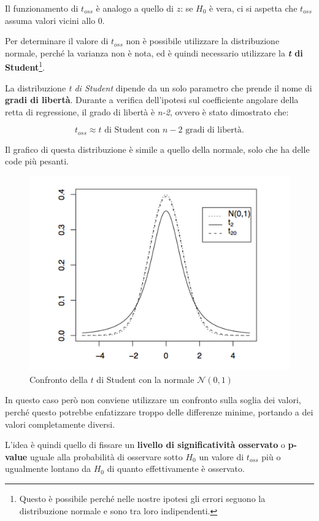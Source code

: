 Il funzionamento di $ t_{oss} $ è analogo a quello di $ z $: se $ H_0 $ è vera, ci si aspetta che $ t_{oss} $ assuma valori vicini allo 0.

Per determinare il valore di $ t_{oss} $ non è possibile utilizzare la distribuzione normale, perché la varianza non è nota, ed è quindi necessario utilizzare la \textbf{\textit{t} di Student}\footnote{Questo è possibile perché nelle nostre ipotesi gli errori seguono la distribuzione normale e sono tra loro indipendenti.}.

La distribuzione \emph{t di Student} dipende da un solo parametro che
prende il nome di \textbf{gradi di libertà}. Durante a verifica
dell'ipotesi sul coefficiente angolare della retta di regressione, il
grado di libertà è \emph{n-2}, ovvero è stato dimostrato che:

$$
t_{oss} \approx t \text{ di Student con } n - 2 \text{ gradi di libertà.}
$$

Il grafico di questa distribuzione è simile a quello della normale, solo
che ha delle code più pesanti.

\begin{figure}[htbp]
\centering
\includegraphics{./notes/immagini/l6-fig5.png}
\caption{Confronto della $ t $ di Student con la normale $ \mathcal{N}(0,1) $}
\end{figure}

In questo caso però non conviene utilizzare un confronto sulla soglia dei valori, perché questo potrebbe enfatizzare troppo delle differenze minime, portando a dei valori completamente diversi.

L'idea è quindi quello di fissare un \textbf{livello di significatività
osservato} o \textbf{p-value} uguale alla probabilità di osservare sotto
$ H_0 $ un valore di $ t_{oss} $ più o ugualmente lontano da $ H_0 $ di quanto
effettivamente è osservato.

